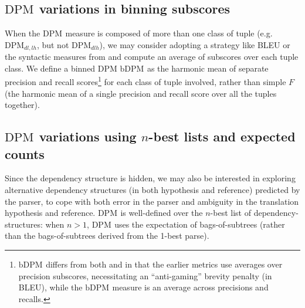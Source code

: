 \documentclass[11pt]{article}
\newcommand{\DPM}[1]{\ensuremath{\mathrm{DPM}_{#1}}}
\newcommand{\DPMempty}{\ensuremath{\DPM{}}}
\newcommand{\bDPM}[1]{\ensuremath{\mathrm{b}\DPM{#1}}}
\begin{document}
\subsection{\DPMempty{} variations in binning subscores}
When the \DPMempty{} measure is composed of more than one class of
tuple (e.g.\ \DPM{dl,lh}, but not \DPM{dlh}), we may consider adopting
a strategy like BLEU \cite{papineni02bleu} or the syntactic measures
from  and compute an average of
subscores over each tuple class. We define a binned DPM \bDPM{} as the
harmonic mean of separate precision and recall
scores\footnote{\bDPM{} differs from both 
  and  in that the earlier metrics use
  averages over precision subscores, necessitating an ``anti-gaming''
  brevity penalty (in BLEU), while the \bDPM{} measure is an average
  across precisions and recalls.} for each class of tuple involved,
rather than simple $F$ (the harmonic mean of a single precision and
recall score over all the tuples together).

\subsection{\DPMempty{} variations using $n$-best lists and expected counts}
Since the dependency structure is hidden, we may also be interested in
exploring alternative dependency structures (in both hypothesis and
reference) predicted by the parser, to cope with both error in the
parser and ambiguity in the translation hypothesis and
reference. \DPMempty{} is well-defined over the $n$-best list of
dependency-structures: when $n>1$, \DPMempty{} uses the expectation of
bags-of-subtrees (rather than the bags-of-subtrees derived from the
1-best parse).
\end{document}
